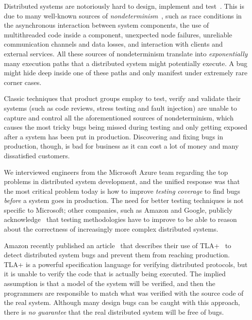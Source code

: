 Distributed systems are notoriously hard to design, implement and test~\cite{cavage2013there, maddox2015test}. This is due to many well-known sources of \emph{nondeterminism}~\cite{chandra2007paxos}, such as race conditions in the asynchronous interaction between system components, the use of multithreaded code inside a component, unexpected node failures, unreliable communication channels and data losses, and interaction with clients and external services.
%
All these sources of nondeterminism translate into \emph{exponentially} many execution paths that a distributed system might potentially execute. A bug might hide deep inside one of these paths and only manifest under extremely rare corner cases.

Classic techniques that product groups employ to test, verify and validate their systems (such as code reviews, stress testing and fault injection) are unable to capture and control all the aforementioned sources of nondeterminism, which causes the most tricky bugs being missed during testing and only getting exposed after a system has been put in production. Discovering and fixing bugs in production, though, is bad for business as it can cost a lot of money and many dissatisfied customers.

We interviewed engineers from the Microsoft Azure team regarding the top problems in distributed system development, and the unified response was that the most critical problem today is how to improve \emph{testing coverage} to find bugs \emph{before} a system goes in production. The need for better testing techniques is not specific to Microsoft; other companies, such as Amazon and Google, publicly acknowledge~\cite{newcombe2015aws} that testing methodologies have to improve to be able to reason about the correctness of increasingly more complex distributed systems.

Amazon recently published an article~\cite{newcombe2015aws} that describes their use of TLA+~\cite{lamport1994temporal} to detect distributed system bugs and prevent them from reaching production. TLA+ is a powerful specification language for verifying distributed protocols, but it is unable to verify the code that is actually being executed. The implied assumption is that a model of the system will be verified, and then the programmers are responsible to match what was verified with the source code of the real system. Although many design bugs can be caught with this approach, there is \emph{no guarantee} that the real distributed system will be free of bugs.

